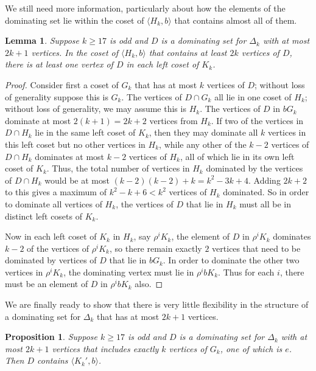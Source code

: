 \documentclass{amsart}
\newtheorem{lem}[thm]{Lemma}
\newtheorem{prop}[thm]{Proposition}
\theoremstyle{remark}
\theoremstyle{definition}
\begin{document}
We still need more information, particularly about how the elements of the dominating set lie within the coset of $\langle H_k,b\rangle$ that contains almost all of them.

\begin{lem}\label{delta-cover-diags}
    Suppose $k \ge 17$ is odd and $D$ is a dominating set for $\Delta_k$ with at most $2k+1$ vertices. In the coset of $\langle H_k, b\rangle$ that contains at least $2k$ vertices of $D$, there is at least one vertex of $D$ in each left coset of $K_k$.
\end{lem}

\begin{proof}
    Consider first a coset of $G_k$ that has at most $k$ vertices of $D$; without loss of generality suppose this is $G_k$. The vertices of $D\cap G_k$ all lie in one coset of $H_k$; without loss of generality, we may assume this is $H_k$. The vertices of $D$ in $bG_k$ dominate at most $2(k+1)=2k+2$ vertices from $H_k$. If two of the vertices in $D \cap H_k$ lie in the same left coset of $K_k$, then they may dominate all $k$ vertices in this left coset but no other vertices in $H_k$, while any other of the $k-2$ vertices of $D\cap H_k$ dominates at most $k-2$ vertices of $H_k$, all of which lie in its own left coset of $K_k$. Thus, the total number of vertices in $H_k$ dominated by the vertices of $D\cap H_k$ would be at most $(k-2)(k-2)+k=k^2-3k+4$. Adding $2k+2$ to this gives a maximum of $k^2-k+6<k^2$ vertices of $H_k$ dominated. So in order to dominate all vertices of $H_k$, the vertices of $D$ that lie in $H_k$ must all be in distinct left cosets of $K_k$.

    Now in each left coset of $K_k$ in $H_k$, say $\rho^iK_k$, the element of $D$ in $\rho^iK_k$ dominates $k-2$ of the vertices of $\rho^iK_k$, so there remain exactly $2$ vertices that need to be dominated by vertices of $D$ that lie in $bG_k$. In order to dominate the other two vertices in $\rho^iK_k$, the dominating vertex must lie in $\rho^ibK_k$. Thus for each $i$, there must be an element of $D$ in $\rho^ibK_k$ also.
\end{proof}

We are finally ready to show that there is very little flexibility in the structure of a dominating set for $\Delta_k$ that has at most $2k+1$ vertices.

\begin{prop}\label{dom-set-structure}
    Suppose $k \ge 17$ is odd and $D$ is a dominating set for $\Delta_k$ with at most $2k+1$ vertices that includes exactly $k$ vertices of $G_k$, one of which is $e$. Then $D$ contains $\langle K_k',b\rangle$.
\end{prop}
\end{document}

